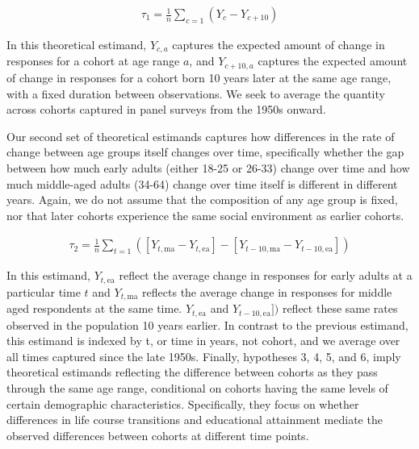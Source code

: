 \documentclass[
  12pt,
]{article}
\begin{document}
\begin{equation*}
 \begin{aligned}
  \tau_1 = \frac{1}{n}\sum_{c=1}(Y_{c}-Y_{c+10})
 \end{aligned}
 \end{equation*}

In this theoretical estimand, \(Y_{c,a}\) captures the expected amount of change in responses for a cohort at age range \(a\), and \(Y_{c+10,a}\) captures the expected amount of change in responses for a cohort born 10 years later at the same age range, with a fixed duration between observations. We seek to average the quantity across cohorts captured in panel surveys from the 1950s onward.

Our second set of theoretical estimands captures how differences in the rate of change between age groups itself changes over time, specifically whether the gap between how much early adults (either 18-25 or 26-33) change over time and how much middle-aged adults (34-64) change over time itself is different in different years. Again, we do not assume that the composition of any age group is fixed, nor that later cohorts experience the same social environment as earlier cohorts.

\begin{equation*}
 \begin{aligned}
   \tau_2 = \frac{1}{n}\sum_{t=1}([Y_{t,\text{ma}} - Y_{{t},\text{ea}}] - [Y_{{t-10},\text{ma}} - Y_{{t-10},\text{ea}}])
 \end{aligned}
 \end{equation*}

In this estimand, \(Y_{t,\text{ea}}\) reflect the average change in responses for early adults at a particular time \(t\) and \(Y_{t,\text{ma}}\) reflects the average change in responses for middle aged respondents at the same time. \(Y_{t,\text{ea}}\) and \(Y_{{t-10},\text{ea}}])\) reflect these same rates observed in the population 10 years earlier. In contrast to the previous estimand, this estimand is indexed by t, or time in years, not cohort, and we average over all times captured since the late 1950s.
Finally, hypotheses 3, 4, 5, and 6, imply theoretical estimands reflecting the difference between cohorts as they pass through the same age range, conditional on cohorts having the same levels of certain demographic characteristics. Specifically, they focus on whether differences in life course transitions and educational attainment mediate the observed differences between cohorts at different time points.
\end{document}
